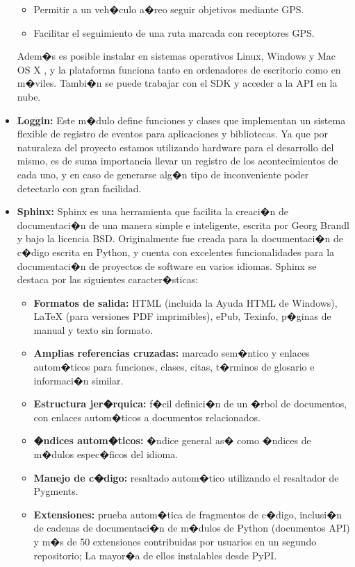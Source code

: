 \begin{itemize}
\begin{itemize}
		\item Permitir a un veh�culo a�reo seguir objetivos mediante GPS.
		
		\item Facilitar el seguimiento de una ruta marcada con receptores GPS.
	\end{itemize}
	
	
	
	Adem�s es posible instalar en sistemas operativos Linux, Windows y Mac OS X , y la plataforma funciona tanto en ordenadores de escritorio como en m�viles. Tambi�n se puede trabajar con el SDK y acceder a la API en la nube.
	
	
	\item \textbf{Loggin:} Este m�dulo define funciones y clases que implementan un sistema flexible de registro de eventos para aplicaciones y bibliotecas. Ya que por naturaleza del proyecto estamos utilizando hardware para el desarrollo del mismo, es de suma importancia llevar un registro de los acontecimientos de cada uno, y en caso de generarse alg�n tipo de inconveniente poder detectarlo con gran facilidad.
	
	\item \textbf{Sphinx: } Sphinx es una herramienta que facilita la creaci�n de documentaci�n de una manera simple e inteligente, escrita por Georg Brandl y bajo la licencia BSD. Originalmente fue creada para la documentaci�n de c�digo escrita en Python, y cuenta con excelentes funcionalidades para la documentaci�n de proyectos de software en varios idiomas. Sphinx se destaca por las siguientes caracter�sticas:
	
	\begin{itemize}
		\item \textbf{Formatos de salida:} HTML (incluida la Ayuda HTML de Windows), LaTeX (para versiones PDF imprimibles), ePub, Texinfo, p�ginas de manual y texto sin formato.
		\item \textbf{Amplias referencias cruzadas:} marcado sem�ntico y enlaces autom�ticos para funciones, clases, citas, t�rminos de glosario e informaci�n similar.
		\item \textbf{Estructura jer�rquica:} f�cil definici�n de un �rbol de documentos, con enlaces autom�ticos a documentos relacionados.
		\item \textbf{�ndices autom�ticos:} �ndice general as� como �ndices de m�dulos espec�ficos del idioma.
		\item \textbf{Manejo de c�digo:} resaltado autom�tico utilizando el resaltador de Pygments.
		\item \textbf{Extensiones:} prueba autom�tica de fragmentos de c�digo, inclusi�n de cadenas de documentaci�n de m�dulos de Python (documentos API) y m�s de 50 extensiones contribuidas por usuarios en un segundo repositorio; La mayor�a de ellos instalables desde PyPI.
	\end{itemize}
	
	
	
	
\end{itemize}


